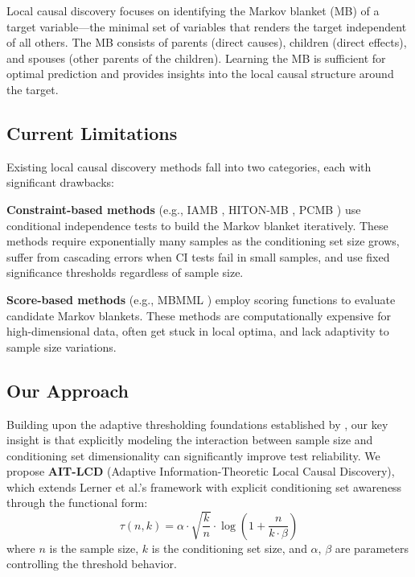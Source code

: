 \documentclass{article}
\theoremstyle{plain}
\theoremstyle{definition}
\begin{document}
Local causal discovery focuses on identifying the Markov blanket (MB) of a target variable---the minimal set of variables that renders the target independent of all others. The MB consists of parents (direct causes), children (direct effects), and spouses (other parents of the children). Learning the MB is sufficient for optimal prediction and provides insights into the local causal structure around the target.

\subsection{Current Limitations}

Existing local causal discovery methods fall into two categories, each with significant drawbacks:

\textbf{Constraint-based methods} (e.g., IAMB \citep{tsamardinos2003algorithms}, HITON-MB \citep{aliferis2003hiton}, PCMB \citep{pena2007towards}) use conditional independence tests to build the Markov blanket iteratively. These methods require exponentially many samples as the conditioning set size grows, suffer from cascading errors when CI tests fail in small samples, and use fixed significance thresholds regardless of sample size.

\textbf{Score-based methods} (e.g., MBMML \citep{tabandeh2021markov}) employ scoring functions to evaluate candidate Markov blankets. These methods are computationally expensive for high-dimensional data, often get stuck in local optima, and lack adaptivity to sample size variations.

\subsection{Our Approach}

Building upon the adaptive thresholding foundations established by \citet{lerner2013adaptive}, our key insight is that explicitly modeling the interaction between sample size and conditioning set dimensionality can significantly improve test reliability. We propose \textbf{AIT-LCD} (Adaptive Information-Theoretic Local Causal Discovery), which extends Lerner et al.'s framework with explicit conditioning set awareness through the functional form:
\begin{equation}
\tau(n, k) = \alpha \cdot \sqrt{\frac{k}{n}} \cdot \log\left(1 + \frac{n}{k \cdot \beta}\right)
\end{equation}
where $n$ is the sample size, $k$ is the conditioning set size, and $\alpha$, $\beta$ are parameters controlling the threshold behavior.
\end{document}
